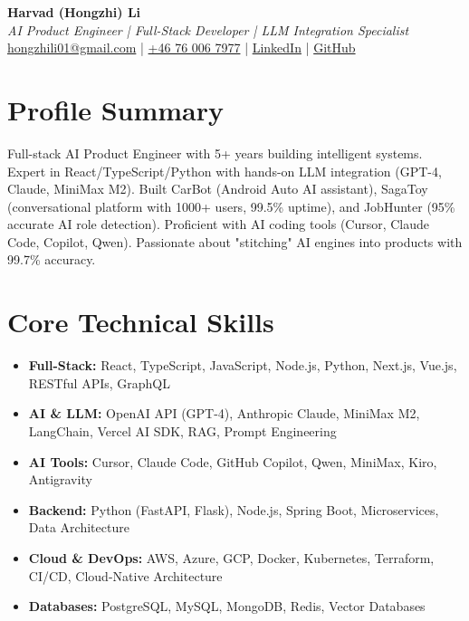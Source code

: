 \documentclass[11pt,a4paper]{article}
\begin{document}
\begin{center}
{\LARGE \textbf{Harvad (Hongzhi) Li}}\\[10pt]
{\Large \textit{AI Product Engineer | Full-Stack Developer | LLM Integration Specialist}}\\[10pt]
\textcolor{titlecolor}{\href{mailto:hongzhili01@gmail.com}{hongzhili01@gmail.com} | \href{tel:+46760067977}{+46 76 006 7977} | \href{https://www.linkedin.com/in/harvad/}{LinkedIn} | \href{https://github.com/bluehawana}{GitHub}}
\end{center}

\vspace{8pt}

\section*{Profile Summary}

Full-stack AI Product Engineer with 5+ years building intelligent systems. Expert in React/TypeScript/Python with hands-on LLM integration (GPT-4, Claude, MiniMax M2). Built CarBot (Android Auto AI assistant), SagaToy (conversational platform with 1000+ users, 99.5\% uptime), and JobHunter (95\% accurate AI role detection). Proficient with AI coding tools (Cursor, Claude Code, Copilot, Qwen). Passionate about "stitching" AI engines into products with 99.7\% accuracy.

\section*{Core Technical Skills}

\begin{itemize}[noitemsep]
\item \textbf{Full-Stack:} React, TypeScript, JavaScript, Node.js, Python, Next.js, Vue.js, RESTful APIs, GraphQL
\item \textbf{AI \& LLM:} OpenAI API (GPT-4), Anthropic Claude, MiniMax M2, LangChain, Vercel AI SDK, RAG, Prompt Engineering
\item \textbf{AI Tools:} Cursor, Claude Code, GitHub Copilot, Qwen, MiniMax, Kiro, Antigravity
\item \textbf{Backend:} Python (FastAPI, Flask), Node.js, Spring Boot, Microservices, Data Architecture
\item \textbf{Cloud \& DevOps:} AWS, Azure, GCP, Docker, Kubernetes, Terraform, CI/CD, Cloud-Native Architecture
\item \textbf{Databases:} PostgreSQL, MySQL, MongoDB, Redis, Vector Databases
\end{itemize}
\end{document}
